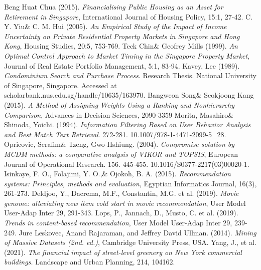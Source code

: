 \documentclass[a4paper, 11pt]{article}
\begin{document}
	\begin{thebibliography}{00} \footnotesize
		Beng Huat Chua (2015). \textit{Financialising Public Housing as an Asset for Retirement in Singapore}, International Journal of Housing Policy, 15:1, 27-42.
		 C. Y. Yiu\& C. M. Hui (2005). \textit{An Empirical Study of the Impact of Income Uncertainty on Private Residential Property Markets in Singapore and Hong Kong}, Housing Studies, 20:5, 753-769.
		 Teck Chin\& Geofrey Mills (1999). \textit{An Optimal Control Approach to Market Timing in the Singapore Property Market}, Journal of Real Estate Portfolio Management, 5:1, 83-94.
		 Kavey, Lee (1989). \textit{Condominium Search and Purchase Process}. Research Thesis. National University of Singapore, Singapore. Accessed at scholarbank.nus.edu.sg/handle/10635/163970.
		 Bangweon Song\& Seokjoong Kang (2015). \textit{A Method of Assigning Weights Using a Ranking and Nonhierarchy Comparison}, Advances in Decision Sciences, 2090-3359
		 Morita, Masahiro\& Shinoda, Yoichi. (1994). \textit{Information Filtering Based on User Behavior Analysis and Best Match Text Retrieval}. 272-281. 10.1007/978-1-4471-2099-5\_28.
		 Opricovic, Serafim\& Tzeng, Gwo-Hshiung. (2004). \textit{Compromise solution by MCDM methods: a comparative analysis of VIKOR and TOPSIS}, European Journal of Operational Research. 156. 445-455. 10.1016/S0377-2217(03)00020-1.
		 Isinkaye, F. O., Folajimi, Y. O.,\& Ojokoh, B. A. (2015). \textit{Recommendation systems: Principles, methods and evaluation}, Egyptian Informatics Journal, 16(3), 261-273.
		 Deldjoo, Y., Dacrema, M.F., Constantin, M.G. et al. (2019). \textit{Movie genome: alleviating new item cold start in movie recommendation}, User Model User-Adap Inter 29, 291-343.
		 Lops, P., Jannach, D., Musto, C. et al. (2019). \textit{Trends in content-based recommendation}, User Model User-Adap Inter 29, 239-249.
		 Jure Leskovec, Anand Rajaraman, and Jeffrey David Ullman. (2014). \textit{Mining of Massive Datasets (2nd. ed.)}, Cambridge University Press, USA.
		 Yang, J., et al. (2021). \textit{The financial impact of street-level greenery on New York commercial buildings.} Landscape and Urban Planning, 214, 104162.

	\end{thebibliography}
\end{document}

